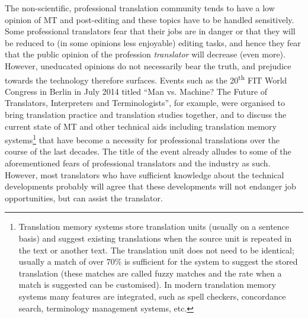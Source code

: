 \documentclass[output=paper]{langsci/langscibook}
\begin{document}
The non-scientific, professional translation community tends to have a low opinion of MT and post-editing and these topics have to be handled sensitively. Some professional translators fear that their jobs are in danger or that they will be reduced to (in some opinions less enjoyable) editing tasks, and hence they fear that the public opinion of the profession \textit{translator} will decrease (even more). However, uneducated opinions do not necessarily bear the truth, and prejudice towards the technology therefore surfaces. Events such as the 20\textsuperscript{th} FIT World Congress in Berlin in July 2014 titled ``Man vs. Machine? The Future of Translators, Interpreters and Terminologists'', for example, were organised to bring translation practice and translation studies together, and to discuss the current state of MT and other technical aids including translation memory systems\footnote{Translation memory systems store translation units (usually on a sentence basis) and suggest existing translations when the source unit is repeated in the text or another text. The translation unit does not need to be identical; usually a match of over 70\% is sufficient for the system to suggest the stored translation (these matches are called fuzzy matches and the rate when a match is suggested can be customised). In modern translation memory systems many features are integrated, such as spell checkers, concordance search, terminology management systems, etc.} that have become a necessity for professional translations over the course of the last decades. The title of the event already alludes to some of the aforementioned fears of professional translators and the industry as such. However, most translators who have sufficient knowledge about the technical developments probably will agree that these developments will not endanger job opportunities, but can assist the translator.
\end{document}
